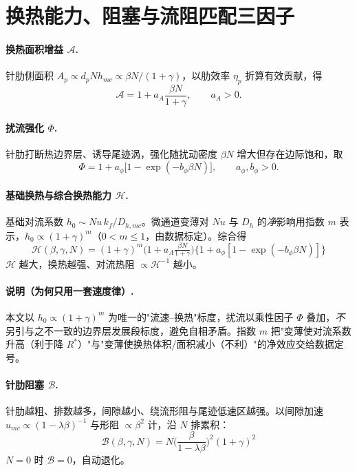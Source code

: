 \documentclass[UTF8,a4paper,12pt]{ctexart}
\numberwithin{equation}{section}
\begin{document}
\section{换热能力、阻塞与流阻匹配三因子}

\paragraph{换热面积增益 $\mathcal A$.}针肋侧面积 $A_p\propto d_pN h_{mc}\propto \beta N/(1+\gamma)$，以肋效率 $\eta_p$ 折算有效贡献，得
\begin{equation}
    \mathcal A=1+a_A\frac{\beta N}{1+\gamma},\qquad a_A>0 .
\end{equation}

\paragraph{扰流强化 $\Phi$.}针肋打断热边界层、诱导尾迹涡，强化随扰动密度 $\beta N$ 增大但存在边际饱和，取
\begin{equation}
    \Phi=1+a_\phi\big[1-\exp(-b_\phi\beta N)\big],\qquad a_\phi,b_\phi>0 .
\end{equation}

\paragraph{基础换热与综合换热能力 $\mathcal H$.}基础对流系数 $h_0\sim Nu\,k_f/D_{h,mc}$。微通道变薄对 $Nu$ 与 $D_h$ 的\emph{净}影响用指数 $m$ 表示，$h_0\propto(1+\gamma)^m$（$0<m\le1$，由数据标定）。综合得
\begin{equation}
    \boxed{\;
    \mathcal H(\beta,\gamma,N)=(1+\gamma)^m
    \Big(1+a_A\tfrac{\beta N}{1+\gamma}\Big)
    \big\{1+a_\phi[1-\exp(-b_\phi\beta N)]\big\}
    \;}
    \label{eq:H}
\end{equation}
$\mathcal H$ 越大，换热越强、对流热阻 $\propto\mathcal H^{-1}$ 越小。

\paragraph{说明（为何只用一套速度律）.}本文以 $h_0\propto(1+\gamma)^m$ 为唯一的"流速--换热"标度，扰流以乘性因子 $\Phi$ 叠加，\emph{不}另引与之不一致的边界层发展段标度，避免自相矛盾。指数 $m$ 把"变薄使对流系数升高（利于降 $R^*$）"与"变薄使换热体积/面积减小（不利）"的净效应交给数据定号。

\paragraph{针肋阻塞 $\mathcal B$.}针肋越粗、排数越多，间隙越小、绕流形阻与尾迹低速区越强。以间隙加速 $u_{mc}\propto(1-\lambda\beta)^{-1}$ 与形阻 $\propto\beta^2$ 计，沿 $N$ 排累积：
\begin{equation}
    \boxed{\;
    \mathcal B(\beta,\gamma,N)=N\Big(\frac{\beta}{1-\lambda\beta}\Big)^2(1+\gamma)^2
    \;}
    \label{eq:B}
\end{equation}
$N=0$ 时 $\mathcal B=0$，自动退化。
\end{document}
